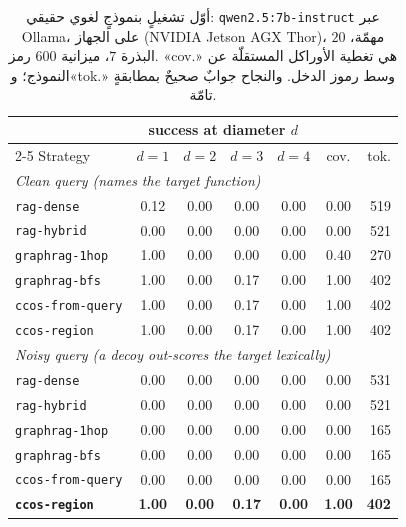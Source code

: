 \documentclass[11pt]{article}
\newcommand{\code}[1]{\textenglish{\texttt{#1}}}
\begin{document}
\begin{table}[h]
\centering
\begin{LTR}
\begin{tabular}{lcccccr}
\toprule
& \multicolumn{4}{c}{\textenglish{success at diameter $d$}} & & \\
\cmidrule(lr){2-5}
\textenglish{Strategy} & $d{=}1$ & $d{=}2$ & $d{=}3$ & $d{=}4$ & \textenglish{cov.} & \textenglish{tok.} \\
\midrule
\multicolumn{7}{l}{\emph{\textenglish{Clean query (names the target function)}}}\\
\code{rag-dense}      & 0.12 & 0.00 & 0.00 & 0.00 & 0.00 & 519 \\
\code{rag-hybrid}     & 0.00 & 0.00 & 0.00 & 0.00 & 0.00 & 521 \\
\code{graphrag-1hop}  & 1.00 & 0.00 & 0.00 & 0.00 & 0.40 & 270 \\
\code{graphrag-bfs}   & 1.00 & 0.00 & 0.17 & 0.00 & 1.00 & 402 \\
\code{ccos-from-query}& 1.00 & 0.00 & 0.17 & 0.00 & 1.00 & 402 \\
\code{ccos-region}    & 1.00 & 0.00 & 0.17 & 0.00 & 1.00 & 402 \\
\midrule
\multicolumn{7}{l}{\emph{\textenglish{Noisy query (a decoy out-scores the target lexically)}}}\\
\code{rag-dense}      & 0.00 & 0.00 & 0.00 & 0.00 & 0.00 & 531 \\
\code{rag-hybrid}     & 0.00 & 0.00 & 0.00 & 0.00 & 0.00 & 521 \\
\code{graphrag-1hop}  & 0.00 & 0.00 & 0.00 & 0.00 & 0.00 & 165 \\
\code{graphrag-bfs}   & 0.00 & 0.00 & 0.00 & 0.00 & 0.00 & 165 \\
\code{ccos-from-query}& 0.00 & 0.00 & 0.00 & 0.00 & 0.00 & 165 \\
\textbf{\code{ccos-region}} & \textbf{1.00} & \textbf{0.00} & \textbf{0.17} & \textbf{0.00} & \textbf{1.00} & \textbf{402} \\
\bottomrule
\end{tabular}
\end{LTR}
\caption{أوّل تشغيلٍ بنموذجٍ لغوي حقيقي: \code{qwen2.5:7b-instruct} عبر Ollama، على الجهاز
(NVIDIA Jetson AGX Thor)، $20$ مهمّة، البذرة $7$، ميزانية $600$ رمز. «\textenglish{cov.}»
هي تغطية الأوراكل المستقلّة عن النموذج؛ و«\textenglish{tok.}» وسط رموز الدخل. والنجاح جوابٌ
صحيحٌ بمطابقةٍ تامّة.}
\label{tab:real}
\end{table}
\end{document}
